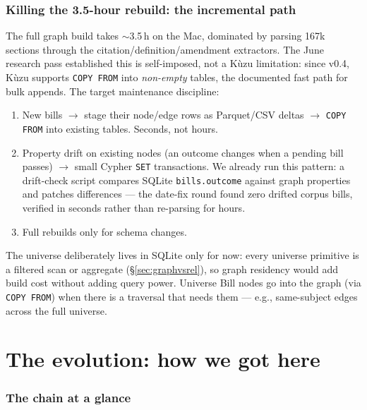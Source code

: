\documentclass[11pt]{article}
\newcommand{\code}[1]{\texttt{#1}}
\begin{document}
\section{Killing the 3.5-hour rebuild: the incremental path}
\label{sec:incremental}

The full graph build takes $\sim$3.5\,h on the Mac, dominated by parsing 167k
sections through the citation/definition/amendment extractors. The June
research pass established this is self-imposed, not a K\`uzu limitation:
since v0.4, K\`uzu supports \code{COPY FROM} into \emph{non-empty} tables, the
documented fast path for bulk appends. The target maintenance discipline:

\begin{enumerate}[itemsep=2pt]
  \item New bills $\to$ stage their node/edge rows as Parquet/CSV deltas
        $\to$ \code{COPY FROM} into existing tables. Seconds, not hours.
  \item Property drift on existing nodes (an outcome changes when a pending
        bill passes) $\to$ small Cypher \code{SET} transactions. We already
        run this pattern: a drift-check script compares SQLite
        \code{bills.outcome} against graph properties and patches differences
        --- the date-fix round found zero drifted corpus bills, verified in
        seconds rather than re-parsing for hours.
  \item Full rebuilds only for schema changes.
\end{enumerate}

The universe deliberately lives in SQLite only for now: every universe
primitive is a filtered scan or aggregate (\S\ref{sec:graphvsrel}), so graph
residency would add build cost without adding query power. Universe Bill
nodes go into the graph (via \code{COPY FROM}) when there is a traversal
that needs them --- e.g., same-subject edges across the full universe.

\part{The evolution: how we got here}

\section{The chain at a glance}
\label{sec:chain}
\end{document}
